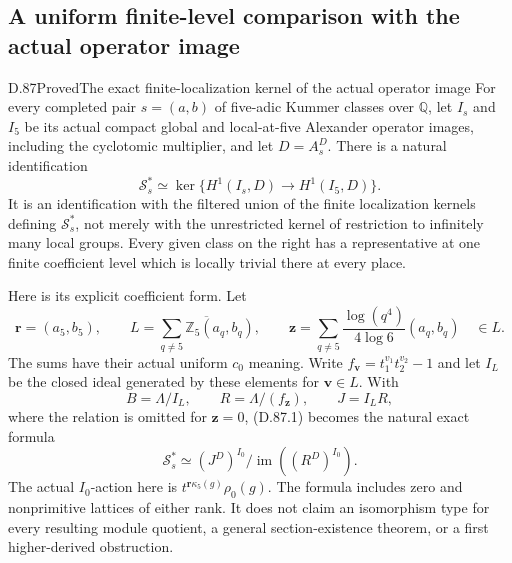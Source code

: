 \subsection{A uniform finite-level comparison with the actual operator image}

\begin{statement}{D.87}{Proved}{The exact finite-localization kernel of the actual operator image}
For every completed pair \(s=(a,b)\) of five-adic Kummer classes
over \(\mathbb Q\), let \(I_s\) and \(I_5\) be its actual
compact global and local-at-five Alexander operator images,
including the cyclotomic multiplier, and let \(D=A_s^D\).
There is a natural identification
\[
 \mathcal S_s^*\simeq
 \ker\{H^1(I_s,D)\longrightarrow H^1(I_5,D)\}.       \tag{D.87.1}
\]
It is an identification with the filtered union of the finite
localization kernels defining \(\mathcal S_s^*\), not merely
with the unrestricted kernel of restriction to infinitely many
local groups. Every given class on the right has a representative
at one finite coefficient level which is locally trivial there
at every place.

Here is its explicit coefficient form. Let
\[
 \mathbf r=(a_5,b_5),\qquad
 L=\overline{\sum_{q\ne5}\mathbb Z_5(a_q,b_q)},\qquad
 \mathbf z=\sum_{q\ne5}\frac{\log(q^4)}{4\log6}(a_q,b_q)
                                                     \quad\in L.
                                                               \tag{D.87.2}
\]
The sums have their actual uniform \(c_0\) meaning. Write
\(f_{\mathbf v}=t_1^{v_1}t_2^{v_2}-1\) and let \(I_L\)
be the closed ideal generated by these elements for
\(\mathbf v\in L\). With
\[
 B=\Lambda/I_L,\qquad R=\Lambda/(f_{\mathbf z}),
                 \qquad J=I_LR,
                                                               \tag{D.87.3}
\]
where the relation is omitted for \(\mathbf z=0\), (D.87.1)
becomes the natural exact formula
\[
 \mathcal S_s^*\simeq
       (J^D)^{I_0}/\operatorname{im}((R^D)^{I_0}).       \tag{D.87.4}
\]
The actual \(I_0\)-action here is
\(t^{\mathbf r\kappa_5(g)}\rho_0(g)\). The formula
includes zero and nonprimitive lattices of either rank.
It does not claim an isomorphism type for every resulting
module quotient, a general section-existence theorem, or a
first higher-derived obstruction.

\end{statement}

